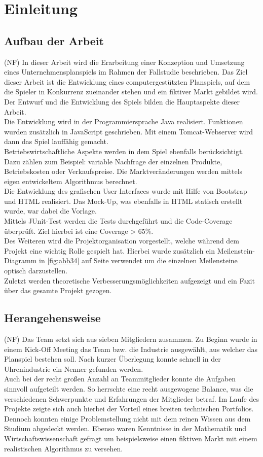 \clearpage
\chapter{Einleitung}
\section{Aufbau der Arbeit}
(NF) In dieser Arbeit wird die Erarbeitung einer Konzeption und Umsetzung eines Unternehmensplanspiels im Rahmen der Fallstudie beschrieben. Das Ziel dieser Arbeit ist die Entwicklung eines computergestützten Planspiels, auf dem die Spieler in Konkurrenz zueinander stehen und ein fiktiver Markt gebildet wird. Der Entwurf und die Entwicklung des Spiels bilden die Hauptaspekte dieser Arbeit. \\
Die Entwicklung wird in der Programmiersprache Java realisiert. Funktionen wurden zusätzlich in JavaScript geschrieben. Mit einem Tomcat-Webserver wird dann das Spiel lauffähig gemacht. \\
Betriebswirtschaftliche Aspekte werden in dem Spiel ebenfalls berücksichtigt. Dazu zählen zum Beispiel: variable Nachfrage der einzelnen Produkte, Betriebskosten oder Verkaufspreise. Die Marktveränderungen werden mittels eigen entwickeltem Algorithmus berechnet. \\
Die Entwicklung des grafischen User Interfaces wurde mit Hilfe von Bootstrap und HTML realisiert. Das Mock-Up, was ebenfalls in HTML statisch erstellt wurde, war dabei die Vorlage. \\ 
Mittels JUnit-Test werden die Tests durchgeführt und die Code-Coverage überprüft. Ziel hierbei ist eine Coverage > 65\%. \\
Des Weiteren wird die Projektorganisation vorgestellt, welche während dem Projekt eine wichtig Rolle gespielt hat. Hierbei wurde zusätzlich ein Meilenstein-Diagramm in \ref{fig:abb34} auf Seite \pageref{sec:meilenstein} verwendet um die einzelnen Meilensteine optisch darzustellen.\\
Zuletzt werden theoretische Verbesserungsmöglichkeiten aufgezeigt und ein Fazit über das gesamte Projekt gezogen.

\clearpage
\section{Herangehensweise}\label{sec:herangehensweise}
(NF) Das Team setzt sich aus sieben Mitgliedern zusammen. Zu Beginn wurde in einem Kick-Off Meeting das Team bzw. die Industrie ausgewählt, aus welcher das Planspiel bestehen soll. Nach kurzer Überlegung konnte schnell in der Uhrenindustrie ein Nenner gefunden werden. \\
Auch bei der recht großen Anzahl an Teammitglieder konnte die Aufgaben sinnvoll aufgeteilt werden. So herrschte eine recht ausgewogene Balance, was die verschiedenen Schwerpunkte und Erfahrungen der Mitglieder betraf. Im Laufe des Projekte zeigte sich auch hierbei der Vorteil eines breiten technischen Portfolios. Dennoch konnten einige Problemstellung nicht mit dem reinen Wissen aus dem Studium abgedeckt werden. Ebenso waren Kenntnisse in der Mathematik und Wirtschaftswissenschaft gefragt um beispielsweise einen fiktiven Markt mit einem realistischen Algorithmus zu versehen.      

